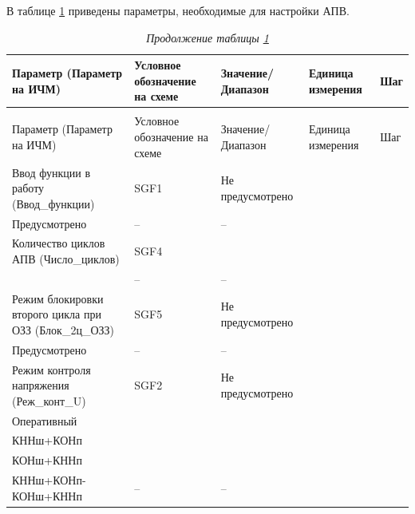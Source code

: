 \par
В таблице \ref{apv:tbl1} приведены параметры, необходимые для настройки АПВ.

\footnotesize
\begin{longtable}{|>{\centering\arraybackslash}m{5.3cm}|>{\centering\arraybackslash}m{3.3cm}|>{\centering\arraybackslash}m{4.2cm}|>{\centering\arraybackslash}m{1.8cm}|>{\centering\arraybackslash}m{1cm}|}
\caption{Параметры для настройки АПВ\hfill\vspace{-0.5\baselineskip}}\label{apv:tbl1}\\ 
\hline
\rowcolor{unimain!40}
Параметр (Параметр на ИЧМ) & Условное обозначение на схеме & Значение/ Диапазон & Единица измерения & Шаг \\ 
\hline
\endfirsthead
\caption*{\hspace{3pt}\emph{Продолжение таблицы \ref{apv:tbl1}\hfill\vspace{-0.5\baselineskip}}} \\ %
\hline
\rowcolor{unimain!40}
Параметр (Параметр на ИЧМ) & Условное обозначение на схеме & Значение/ Диапазон & Единица измерения & Шаг \\ 
\endhead
\endfoot
\endlastfoot
\centering Ввод функции в работу (Ввод\_функции)  & \centering SGF1 & \centering Не предусмотрено \\ Предусмотрено & \centering -- & \centering \arraybackslash -- \\
\hline
\centering Количество циклов АПВ (Число\_циклов)  & \centering SGF4 & \centering 1 \\ 2 & \centering -- & \centering \arraybackslash -- \\
\hline
\centering Режим блокировки второго цикла при ОЗЗ (Блок\_2ц\_ОЗЗ)  & \centering SGF5 & \centering Не предусмотрено \\ Предусмотрено & \centering -- & \centering \arraybackslash -- \\
\hline
\centering Режим контроля напряжения (Реж\_конт\_U)  & \centering SGF2 & \centering Не предусмотрено \\ Оперативный \\ КННш+КОНп \\ КОНш+КННп \\ КННш+КОНп-КОНш+КННп & \centering -- & \centering \arraybackslash -- \\
\hline

\end{longtable}
